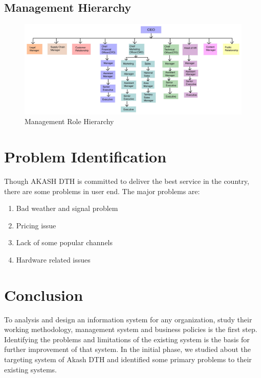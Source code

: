 \begin{spacing}{1.0}
\subsection{Management Hierarchy}
\begin{figure}[H]
	\centering
	\includegraphics[width=\textwidth]{hierarchy}
	\caption{Management Role Hierarchy}
	\label{fig:hierarchy}
\end{figure}

\section{Problem Identification}
Though AKASH DTH is committed to deliver the best service in the country, there are some problems in user end. The major problems are:
\begin{enumerate}
\item Bad weather and signal problem
\item Pricing issue
\item Lack of some popular channels
\item Hardware related issues
\end{enumerate}

\section{Conclusion}
To analysis and design an information system for any organization, study their working methodology, management system and business policies is the first step. Identifying the problems and limitations of the existing system is the basis for further improvement of that system. In the initial phase, we studied about the targeting system of Akash DTH and identified some primary problems to their existing systems.     
\end{spacing}

\newpage
